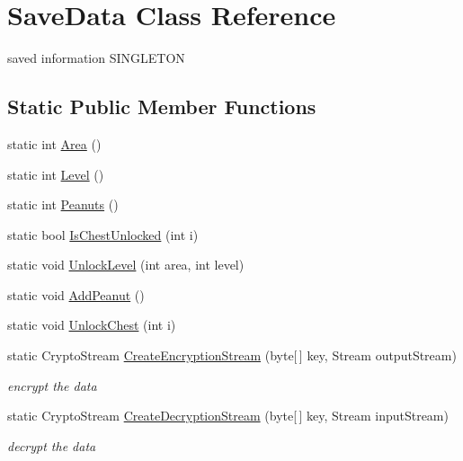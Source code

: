 \hypertarget{class_save_data}{}\section{Save\+Data Class Reference}
\label{class_save_data}


saved information S\+I\+N\+G\+L\+E\+T\+ON  


\subsection*{Static Public Member Functions}
\begin{DoxyCompactItemize}
\item 
static int \mbox{\hyperlink{class_save_data_a22fab0214f794c9bc004557484e51fc0}{Area}} ()
\item 
static int \mbox{\hyperlink{class_save_data_ae7027796e3b0ca976e50853407bdd78a}{Level}} ()
\item 
static int \mbox{\hyperlink{class_save_data_a5de49da680f4432b988e56698c79dee5}{Peanuts}} ()
\item 
static bool \mbox{\hyperlink{class_save_data_adcb64a2f684f5f008e8b133650556ca9}{Is\+Chest\+Unlocked}} (int i)
\item 
static void \mbox{\hyperlink{class_save_data_aec63ccf3e0c1ac28e5f77f82129d6d35}{Unlock\+Level}} (int area, int level)
\item 
static void \mbox{\hyperlink{class_save_data_a6094e9e834bdc6589bc86e863f1bce9b}{Add\+Peanut}} ()
\item 
static void \mbox{\hyperlink{class_save_data_ab5229c785ecca1e100795a57ce9d50cc}{Unlock\+Chest}} (int i)
\item 
static Crypto\+Stream \mbox{\hyperlink{class_save_data_abefac0386b4128e4444b28554e3bdce3}{Create\+Encryption\+Stream}} (byte\mbox{[}$\,$\mbox{]} key, Stream output\+Stream)
\begin{DoxyCompactList}\small\item\em encrypt the data \end{DoxyCompactList}\item 
static Crypto\+Stream \mbox{\hyperlink{class_save_data_a797f7cb34d1d4643d7606abd09abb352}{Create\+Decryption\+Stream}} (byte\mbox{[}$\,$\mbox{]} key, Stream input\+Stream)
\begin{DoxyCompactList}\small\item\em decrypt the data \end{DoxyCompactList}\end{DoxyCompactItemize}


